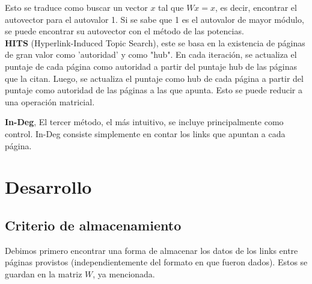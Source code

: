 \documentclass[a4paper]{article}
\begin{document}
Esto se traduce como buscar un vector $x$ tal que $Wx=x$, es decir, encontrar el autovector para el autovalor 1. Si se sabe que 1 es el autovalor de mayor módulo, se puede encontrar su autovector con el método de las potencias.\\

\textbf{HITS} (Hyperlink-Induced Topic Search), este se basa en la existencia de páginas de gran valor como 'autoridad' y como "hub". En cada iteración, se actualiza el puntaje de cada página como autoridad a partir del puntaje hub de las páginas que la citan. Luego, se actualiza el puntaje como hub de cada página a partir del puntaje como autoridad de las páginas a las que apunta. Esto se puede reducir a una operación matricial.

\textbf{In-Deg}, El tercer método, el más intuitivo, se incluye principalmente como control. In-Deg consiste simplemente en contar los links que apuntan a cada página.\\

\newpage

\section{Desarrollo}
\label{sec:desarrollo}


\subsection{Criterio de almacenamiento}
Debimos primero encontrar una forma de almacenar los datos de los links entre p\'{a}ginas provistos (independientemente del formato en que fueron dados). Estos se guardan en la matriz $W$, ya mencionada.
\end{document}
